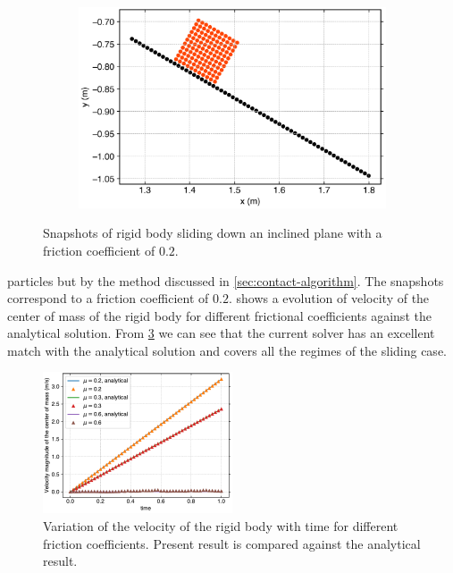 \begin{figure}[!htpb]
  \begin{subfigure}{0.48\textwidth}
    \centering
    \includegraphics[width=1.0\textwidth]{figures/rfc/figures/mohseni_2021_free_sliding_on_a_slope_2d/fric_coeff_0_2/time2}
    \label{fig:passing-2}
  \end{subfigure}
  \caption{Snapshots of rigid body sliding down an inclined plane with a
    friction coefficient of $0.2$.}
\label{fig:mohseni-2021-sliding-2d}
\end{figure}
particles but by the method discussed in \cref{sec:contact-algorithm}. The
snapshots correspond to a friction coefficient of $0.2$.
 shows a evolution of
velocity of the center of mass of the rigid body for different frictional
coefficients against the analytical solution. From
\cref{fig:results-solid-sliding-velocity-vs-time-2d} we can see that the current
solver has an excellent match with the analytical solution and covers all the
regimes of the sliding case.
\begin{figure}[!htpb]
  \centering
  \includegraphics[width=0.5\textwidth]{figures/rfc/figures/mohseni_2021_free_sliding_on_a_slope_2d/velocity_vs_time}
  \caption{Variation of the velocity of the rigid body with time for different
    friction coefficients. Present result is compared against the analytical
    result.}
\label{fig:results-solid-sliding-velocity-vs-time-2d}
\end{figure}

